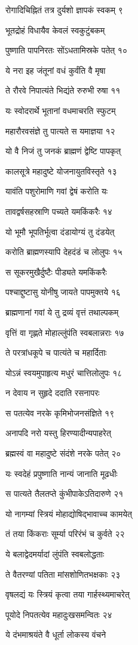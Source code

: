 रोगादिचिह्नितं तत्र दुर्यशो ज्ञापकं स्वकम् ९

भूतद्रोहं विधायैव केवलं स्वकुटुंबकम्

पुष्णाति पापनिरतः सोंऽधतामिस्रके पतेत् १०

ये नरा इह जंतूनां वधं कुर्वंति वै मृषा

ते रौरवे निपात्यंते भिद्यंते रुरुभी रुषा ११

यः स्वोदरार्थे भूतानां वधमाचरति स्फुटम्

महारौरवसंज्ञे तु पात्यते स यमाज्ञया १२

यो वै निजं तु जनकं ब्राह्मणं द्वेष्टि पापकृत्

कालसूत्रे महादुष्टे योजनायुतविस्तृते १३

यावंति पशुरोमाणि गवां द्वेषं करोति यः

तावद्वर्षसहस्राणि पच्यते यमकिंकरैः १४

यो भूमौ भूपतिर्भूत्वा दंडायोग्यं तु दंडयेत्

करोति ब्राह्मणस्यापि देहदंडं च लोलुपः १५

स सूकरमुखैर्दुष्टैः पीड्यते यमकिंकरैः

पश्चाद्दुष्टासु योनीषु जायते पापमुक्तये १६

ब्राह्मणानां गवां ये तु द्रव्यं वृत्तं तथाल्पकम्

वृत्तिं वा गृह्णते मोहाल्लुंपंति स्वबलान्नराः १७

ते परत्रांधकूपे च पात्यंते च महार्दिताः

योऽन्नं स्वयमुपाहृत्य मधुरं चात्तिलोलुपः १८

न देवाय न सुहृदे ददाति रसनापरः

स पतत्येव नरके कृमिभोजनसंज्ञिते १९

अनापदि नरो यस्तु हिरण्यादीन्यपाहरेत्

ब्रह्मस्वं वा महादुष्टे संदंशे नरके पतेत् २०

यः स्वदेहं प्रपुष्णाति नान्यं जानाति मूढधीः

स पात्यते तैलतप्ते कुंभीपाकेऽतिदारुणे २१

यो नागम्यां स्त्रियं मोहाद्योषिद्भावाच्च कामयेत्

तं तया किंकराः सूर्म्या परिरंभं च कुर्वते २२

ये बलाद्वेदमर्यादां लुंपंति स्वबलोद्धताः

ते वैतरण्यां पतिता मांसशोणितभक्षकाः २३

वृषलद्यं यः स्त्रियं कृत्वा तया गार्हस्थ्यमाचरेत्

पूयोदे निपतत्येव महादुःखसमन्वितः २४

ये दंभमाश्रयंते वै धूर्ता लोकस्य वंचने

